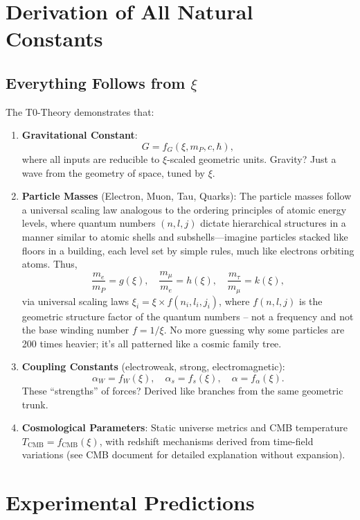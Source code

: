 	\section{Derivation of All Natural Constants}
	
	\subsection{Everything Follows from $\xi$}
	The T0-Theory demonstrates that:
	
	\begin{enumerate}
		\item \textbf{Gravitational Constant}:
		\[
		G = f_G(\xi, m_P, c, \hbar),
		\]
		where all inputs are reducible to $\xi$-scaled geometric units. Gravity? Just a wave from the geometry of space, tuned by $\xi$.
		
		\item \textbf{Particle Masses} (Electron, Muon, Tau, Quarks):
		The particle masses follow a universal scaling law analogous to the ordering principles of atomic energy levels, where quantum numbers $(n, l, j)$ dictate hierarchical structures in a manner similar to atomic shells and subshells—imagine particles stacked like floors in a building, each level set by simple rules, much like electrons orbiting atoms. Thus,
		\[
		\frac{m_e}{m_P} = g(\xi), \quad \frac{m_\mu}{m_e} = h(\xi), \quad \frac{m_\tau}{m_\mu} = k(\xi),
		\]
		via universal scaling laws $\xi_i = \xi \times f(n_i, l_i, j_i)$, where $f(n,l,j)$ is the geometric structure factor of the quantum numbers -- not a frequency and not the base winding number $f = 1/\xi$. No more guessing why some particles are 200 times heavier; it's all patterned like a cosmic family tree.
		
		\item \textbf{Coupling Constants} (electroweak, strong, electromagnetic):
		\[
		\alpha_W = f_W(\xi), \quad \alpha_s = f_s(\xi), \quad \alpha = f_\alpha(\xi).
		\]
		These ``strengths'' of forces? Derived like branches from the same geometric trunk.
		
		\item \textbf{Cosmological Parameters}:
		Static universe metrics and CMB temperature $T_{\text{CMB}} = f_{\text{CMB}}(\xi)$, with redshift mechanisms derived from time-field variations (see CMB document for detailed explanation without expansion).
	\end{enumerate}

	\section{Experimental Predictions}
	

